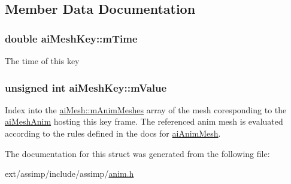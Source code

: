 \subsection{Member Data Documentation}
\hypertarget{structai_mesh_key_a0814e4b14ed162295ba19331410a51ab}{
\subsubsection[{m\-Time}]{\setlength{\rightskip}{0pt plus 5cm}double ai\-Mesh\-Key\-::m\-Time}}\label{structai_mesh_key_a0814e4b14ed162295ba19331410a51ab}
The time of this key \hypertarget{structai_mesh_key_abdd5914697609a9d876f63b6ca090a18}{
\subsubsection[{m\-Value}]{\setlength{\rightskip}{0pt plus 5cm}unsigned int ai\-Mesh\-Key\-::m\-Value}}\label{structai_mesh_key_abdd5914697609a9d876f63b6ca090a18}
Index into the \hyperlink{structai_mesh_a5078f7db7e99ed05db89dfa412f0e990}{ai\-Mesh\-::m\-Anim\-Meshes} array of the mesh coresponding to the \hyperlink{structai_mesh_anim}{ai\-Mesh\-Anim} hosting this key frame. The referenced anim mesh is evaluated according to the rules defined in the docs for \hyperlink{structai_anim_mesh}{ai\-Anim\-Mesh}. 

The documentation for this struct was generated from the following file\-:\begin{DoxyCompactItemize}
\item 
ext/assimp/include/assimp/\hyperlink{anim_8h}{anim.\-h}\end{DoxyCompactItemize}
